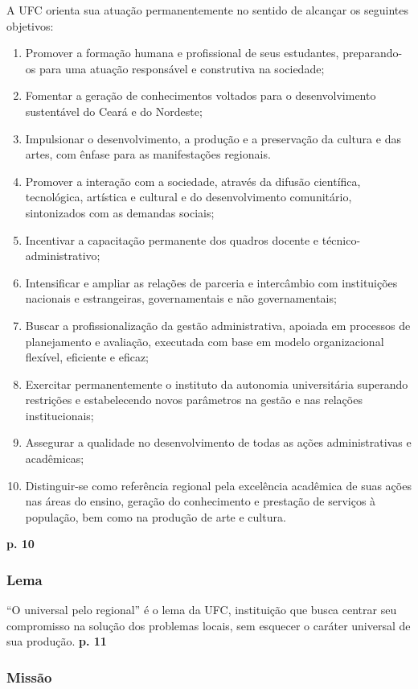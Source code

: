 \documentclass{article}
\begin{document}
A UFC orienta sua atuação permanentemente no sentido de alcançar os seguintes objetivos:
\begin{enumerate}
\item
Promover a formação humana e profissional de seus estudantes, preparando-os para uma atuação responsável e construtiva na sociedade;
\item
Fomentar a geração de conhecimentos voltados para o desenvolvimento sustentável do Ceará e do Nordeste;
\item
Impulsionar o desenvolvimento, a produção e a preservação da cultura e das artes, com ênfase para as manifestações regionais.
\item
Promover a interação com a sociedade, através da difusão científica, tecnológica, artística e cultural e do desenvolvimento comunitário, sintonizados com as demandas sociais;
\item
Incentivar a capacitação permanente dos quadros docente e técnico-administrativo;
\item
Intensificar e ampliar as relações de parceria e intercâmbio com instituições nacionais e estrangeiras, governamentais e não governamentais;
\item
Buscar a profissionalização da gestão administrativa, apoiada em processos de planejamento e avaliação, executada com base em modelo organizacional flexível, eficiente e eficaz;
\item
Exercitar permanentemente o instituto da autonomia universitária superando restrições e estabelecendo novos parâmetros na gestão e nas relações institucionais;
\item
Assegurar a qualidade no desenvolvimento de todas as ações administrativas e acadêmicas;
\item
Distinguir-se como referência regional pela excelência acadêmica de suas ações nas áreas do ensino, geração do conhecimento e prestação de serviços à população, bem como na produção de arte e cultura.
\end{enumerate}
\textbf{p. 10}

\subsubsection{Lema}

“O universal pelo regional” é o lema da UFC, instituição que busca centrar seu compromisso na solução dos problemas locais, sem esquecer o caráter universal de sua produção.
\textbf{p. 11}

\subsubsection{Missão}
\end{document}
